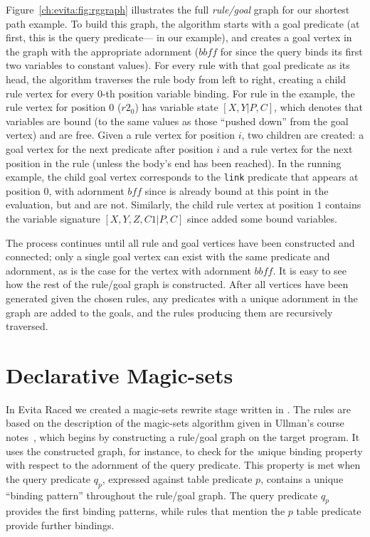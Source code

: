 Figure~\ref{ch:evita:fig:rggraph} illustrates the full {\em rule/goal} graph
for our shortest path example.  To build this graph, the algorithm starts with
a goal predicate (at first, this is the query predicate--- in our
example), and creates a goal vertex in the graph with the appropriate adornment
($\mathit{bbff}$ for  since the query binds its first two variables to
constant values).  For every rule with that goal predicate as its head, the
algorithm traverses the rule body from left to right, creating a child rule
vertex for every $0$-th position variable binding.  For rule  in the
example, the rule vertex for position $0$ ($r2_0$) has variable state
$[X,Y|P,C]$, which denotes that variables  are bound (to the same
values as those ``pushed down'' from the goal vertex) and  are free.
Given a rule vertex for position $i$, two children are created: a goal vertex
for the next predicate after position $i$ and a rule vertex for the next
position in the rule (unless the body's end has been reached).  In the running
example, the child goal vertex corresponds to the {\tt link} predicate that
appears at position $0$, with adornment $\mathit{bff}$ since  is already
bound at this point in the evaluation, but  and  are not.
Similarly, the child rule vertex at position $1$ contains the variable
signature $[X,Y,Z,C1|P,C]$ since  added some bound variables.  

The process continues until all rule and goal vertices have been constructed
and connected; only a single goal vertex can exist with the same predicate and
adornment, as is the case for the  vertex with adornment
$\mathit{bbff}$.  It is easy to see how the rest of the rule/goal graph is
constructed.  After all vertices have been generated given the chosen rules,
any predicates with a unique adornment in the graph are added to the goals, and
the rules producing them are recursively traversed.

\section{Declarative Magic-sets}
\label{ch:magic:sec:rules}

In Evita Raced we created a magic-sets rewrite stage written in \OVERLOG.  The
\OVERLOG rules are based on the description of the magic-sets algorithm given
in Ullman's course notes~\cite{ullmanNotes}, which begins by constructing a
rule/goal graph on the target program.  It uses the constructed graph, for
instance, to check for the {\emph unique binding property} with respect to the
adornment of the query predicate.  This property is met when the query
predicate $q_p$, expressed against table predicate $p$, contains a unique
``binding pattern'' throughout the rule/goal graph.  The query predicate $q_p$
provides the first binding patterns, while rules that mention the $p$ table
predicate provide further bindings.  


